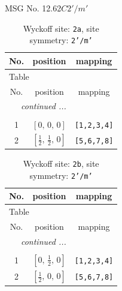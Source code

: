 \documentclass[fleqn,8pt]{jsarticle}
\begin{document}
\setcounter{MaxMatrixCols}{32}

\renewcommand{\tablename}{Table~}
\renewcommand{\figurename}{Figure~}
\begin{center}
\LARGE
MSG No. 12.62\quad$C2'/m'$
\end{center}
\renewcommand{\arraystretch}{1.2}
\begin{longtable}{ccc}
\caption{Wyckoff site: {\tt 2a}, site symmetry: {\tt 2'/m'}}
 \\
 \hline \hline
No. & position & mapping \\ \hline \endfirsthead

\multicolumn{2}{l}{\tablename\ \thetable{}} \\
 \hline \hline
No. & position & mapping \\ \hline \endhead

 \hline \hline
\multicolumn{2}{r}{\footnotesize\it continued ...} \\ \endfoot

 \hline \hline
\multicolumn{2}{r}{} \\ \endlastfoot

1 & $\left[ 0,\, 0,\, 0 \right]$ & {\tt [1,2,3,4]} \\ \hline
2 & $\left[ \frac{1}{2},\, \frac{1}{2},\, 0 \right]$ & {\tt [5,6,7,8]} \\
\end{longtable}
\renewcommand{\arraystretch}{1.2}
\begin{longtable}{ccc}
\caption{Wyckoff site: {\tt 2b}, site symmetry: {\tt 2'/m'}}
 \\
 \hline \hline
No. & position & mapping \\ \hline \endfirsthead

\multicolumn{2}{l}{\tablename\ \thetable{}} \\
 \hline \hline
No. & position & mapping \\ \hline \endhead

 \hline \hline
\multicolumn{2}{r}{\footnotesize\it continued ...} \\ \endfoot

 \hline \hline
\multicolumn{2}{r}{} \\ \endlastfoot

1 & $\left[ 0,\, \frac{1}{2},\, 0 \right]$ & {\tt [1,2,3,4]} \\ \hline
2 & $\left[ \frac{1}{2},\, 0,\, 0 \right]$ & {\tt [5,6,7,8]} \\
\end{longtable}
\renewcommand{\arraystretch}{1.2}
\end{document}
